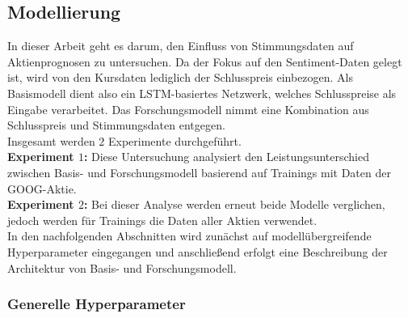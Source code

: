 \newpage
\subsection{Modellierung}\label{sec:modellierung}

In dieser Arbeit geht es darum, den Einfluss von Stimmungsdaten auf Aktienprognosen zu untersuchen. Da der Fokus auf den Sentiment-Daten gelegt ist, wird von den Kursdaten lediglich der Schlusspreis einbezogen. Als Basismodell dient also ein \ac{LSTM}-basiertes Netzwerk, welches Schlusspreise als Eingabe verarbeitet. Das Forschungsmodell nimmt eine Kombination aus Schlusspreis und Stimmungsdaten entgegen. \\
Insgesamt werden $2$ Experimente durchgeführt. \\
\textbf{Experiment $1$:}    
Diese Untersuchung analysiert den Leistungsunterschied zwischen Basis- und Forschungsmodell basierend auf Trainings mit Daten der GOOG-Aktie. \\
\textbf{Experiment $2$:}   
Bei dieser Analyse werden erneut beide Modelle verglichen, jedoch werden für Trainings die Daten aller Aktien verwendet. \\
In den nachfolgenden Abschnitten wird zunächst auf modellübergreifende Hyperparameter eingegangen und anschließend erfolgt eine Beschreibung der Architektur von Basis- und Forschungsmodell.

\subsubsection{Generelle Hyperparameter}\label{sec:modellierung_generell_hp}

